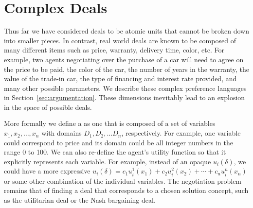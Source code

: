 

\section{Complex Deals}
\label{sec:complex-deals}

Thus far we have considered deals to be atomic units that cannot be
broken down into smaller pieces. In contrast, real world deals are
known to be composed of many different items such as price, warranty,
delivery time, color, etc. For example, two agents negotiating over
the purchase of a car will need to agree on the price to be paid, the
color of the car, the number of years in the warranty, the value of
the trade-in car, the type of financing and interest rate provided,
and many other possible parameters. We describe these complex
preference languages in Section~\ref{sec:argumentation}. These
dimensions inevitably lead to an explosion in the space of possible
deals.

More formally we define a  as one that is
composed of a set of variables $x_1, x_2,\ldots,x_n$ with domains
$D_1,D_2,\ldots D_n$, respectively. For example, one variable could
correspond to price and its domain could be all integer numbers in the
range 0 to 100. We can also re-define the agent's utility function so
that it explicitly represents each variable. For example, instead of
an opaque $u_i(\delta)$, we could have a more expressive $u_i(\delta)
= c_1 u_i^1(x_1) + c_2 u_i^2(x_2) + \cdots + c_n u_i^n(x_n)$ or some
other combination of the individual variables. The negotiation problem
remains that of finding a deal that corresponds to a chosen solution
concept, such as the utilitarian deal or the Nash bargaining deal.

